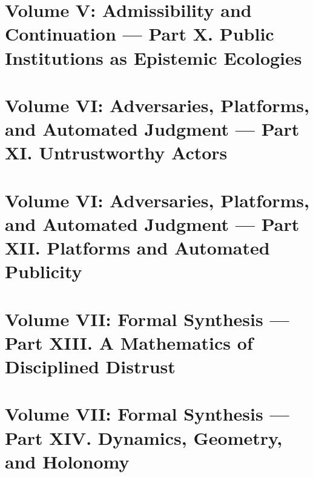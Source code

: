 \documentclass[11pt]{book}
\begin{document}
\part{Volume V: Admissibility and Continuation --- Part X. Public Institutions as Epistemic Ecologies}









\part{Volume VI: Adversaries, Platforms, and Automated Judgment --- Part XI. Untrustworthy Actors}







\part{Volume VI: Adversaries, Platforms, and Automated Judgment --- Part XII. Platforms and Automated Publicity}









\part{Volume VII: Formal Synthesis --- Part XIII. A Mathematics of Disciplined Distrust}







\part{Volume VII: Formal Synthesis --- Part XIV. Dynamics, Geometry, and Holonomy}







\end{document}
